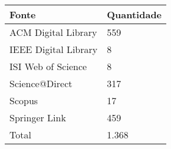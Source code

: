\begin{table}
\small
\centering
\begin{tabular}{p{4cm}|p{2cm}}
\hline
\textbf{Fonte} & \textbf{Quantidade} \\
\hline
ACM Digital Library               & 559\\
IEEE Digital Library              & 8\\
ISI Web of Science                & 8\\
Science@Direct                    & 317\\
Scopus                            & 17\\
Springer Link                     & 459\\ \hline
Total         & 1.368          
\end{tabular}
\end{table}